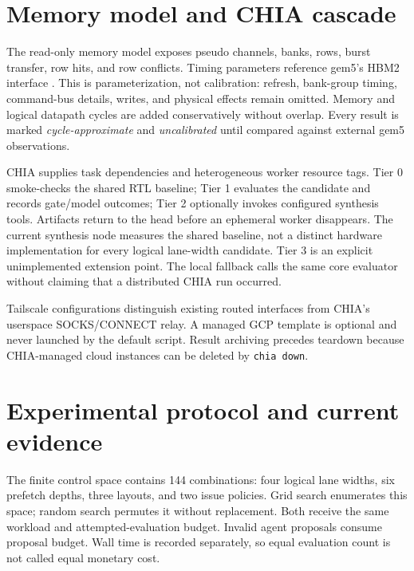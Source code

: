 \documentclass[conference]{IEEEtran}
\begin{document}
\section{Memory model and CHIA cascade}
The read-only memory model exposes pseudo channels, banks, rows, burst transfer,
row hits, and row conflicts. Timing parameters reference gem5's HBM2 interface
\cite{gem5hbm}. This is parameterization, not calibration: refresh, bank-group
timing, command-bus details, writes, and physical effects remain omitted. Memory
and logical datapath cycles are added conservatively without overlap. Every
result is marked \emph{cycle-approximate} and \emph{uncalibrated} until compared
against external gem5 observations.

CHIA \cite{chia} supplies task dependencies and heterogeneous worker resource
tags. Tier 0 smoke-checks the shared RTL baseline; Tier 1 evaluates the candidate
and records gate/model outcomes; Tier 2 optionally invokes configured synthesis
tools. Artifacts return to the head before an ephemeral worker disappears. The
current synthesis node measures the shared baseline, not a distinct hardware
implementation for every logical lane-width candidate. Tier 3 is an explicit
unimplemented extension point. The local fallback calls the same core evaluator
without claiming that a distributed CHIA run occurred.

Tailscale configurations distinguish existing routed interfaces from CHIA's
userspace SOCKS/CONNECT relay. A managed GCP template is optional and never
launched by the default script. Result archiving precedes teardown because
CHIA-managed cloud instances can be deleted by \texttt{chia down}.

\section{Experimental protocol and current evidence}
The finite control space contains 144 combinations: four logical lane widths,
six prefetch depths, three layouts, and two issue policies. Grid search
enumerates this space; random search permutes it without replacement. Both
receive the same workload and attempted-evaluation budget. Invalid agent
proposals consume proposal budget. Wall time is recorded separately, so equal
evaluation count is not called equal monetary cost.
\end{document}
